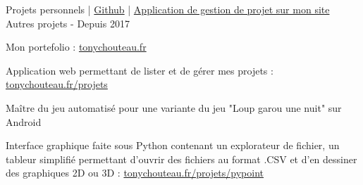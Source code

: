 \begin{cventries}
  \cventry
    {Projets personnels | \href{https://github.com/TonyChouteau?tab=repositories}{\faGithubSquare\acvHeaderIconSep Github} | 
    \href{https://www.tonychouteau.fr/projets/}
    {\faHome\acvHeaderIconSep Application de gestion de projet sur mon site} %
    } %
    {Autres projets} %
    {-} %
    {Depuis 2017} %
    {
      \begin{cvitems} %
        \item {Mon portefolio : \href{https://www.tonychouteau.fr}{tonychouteau.fr}}
        \item {Application web permettant de lister et de gérer mes projets : \href{https://www.tonychouteau.fr/projets}{tonychouteau.fr/projets}}
        \item {Maître du jeu automatisé pour une variante du jeu "Loup garou une nuit" sur Android}
        \item {Interface graphique faite sous Python contenant un explorateur de fichier, un tableur simplifié permettant d'ouvrir des fichiers au format .CSV et d’en dessiner des graphiques 2D ou 3D : \href{https://www.tonychouteau.fr/projets/pypoint}{tonychouteau.fr/projets/pypoint}}
      \end{cvitems}
    }
\end{cventries}
